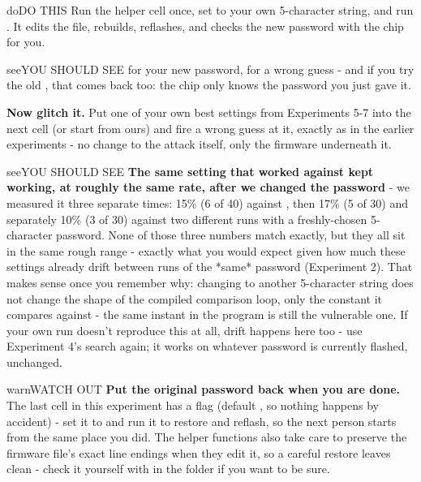 \documentclass[11pt,letterpaper]{article}
\begin{document}
\begin{guidecallout}{do}{DO THIS}
Run the helper cell once, set  to your own 5-character string, and run
. It edits the file, rebuilds, reflashes, and checks the new password with
the chip for you.
\end{guidecallout}

\begin{guidecallout}{see}{YOU SHOULD SEE}
 for your new password,  for a wrong guess - and if you try the old
, that comes back  too: the chip only knows the password you
just gave it.
\end{guidecallout}

\textbf{Now glitch it.} Put one of your own best settings from Experiments 5-7 into the next cell (or start from ours)
and fire a wrong guess at it, exactly as in the earlier experiments - no change to the attack itself, only the
firmware underneath it.

\begin{guidecallout}{see}{YOU SHOULD SEE}
\textbf{The same setting that worked against  kept working, at roughly the
same rate, after we changed the password} - we measured it three separate times: 15\% (6 of 40) against
, then 17\% (5 of 30) and separately 10\% (3 of 30) against two different
runs with a freshly-chosen 5-character password. None of those three numbers match exactly, but they all sit in the
same rough range - exactly what you would expect given how much these settings already drift between runs of the
*same* password (Experiment 2). That makes sense once you remember why: changing
 to another 5-character string does not change the shape of the compiled
comparison loop, only the constant it compares against - the same instant in the program is still the vulnerable one.
If your own run doesn't reproduce this at all, drift happens here too - use Experiment 4's search again; it works on
whatever password is currently flashed, unchanged.
\end{guidecallout}

\begin{guidecallout}{warn}{WATCH OUT}
\textbf{Put the original password back when you are done.} The last cell in this experiment has a
 flag (default , so nothing happens by accident) - set it to  and run
it to restore  and reflash, so the next person starts from the same place
you did. The helper functions also take care to preserve the firmware file's exact line endings when they edit it, so
a careful restore leaves  clean - check it yourself with  in the 
folder if you want to be sure.
\end{guidecallout}
\end{document}
